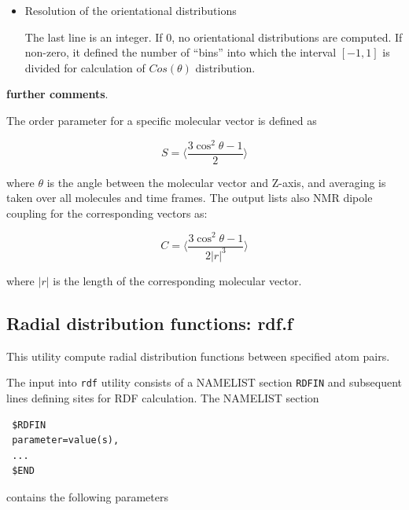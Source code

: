 \documentclass{article}
\begin{document}
\begin{itemize}
\item
Resolution of the orientational distributions

The last line is an integer. If 0, no orientational distributions are 
computed. If non-zero, it defined the number of ``bins'' into which
the interval $[-1,1]$ is divided for calculation of $Cos(\theta)$
distribution.
 
\end{itemize}

{\bf further comments}.

The order parameter for a specific molecular vector is defined as

$$S = \langle \frac{3\cos^2\theta - 1}{2}\rangle$$

where $\theta$ is the angle between the molecular vector and Z-axis, and 
averaging is taken over all molecules and time frames.
The output lists also NMR dipole coupling for the corresponding vectors as:

$$C = \langle \frac{3\cos^2\theta - 1}{2|r|^3}\rangle$$
  
where $|r|$ is the length of the corresponding molecular vector.

\subsection{Radial distribution functions: rdf.f}

This utility compute radial distribution functions between specified 
atom pairs.

The input into \verb|rdf| utility consists of a NAMELIST section
\verb|RDFIN| and subsequent lines defining sites for RDF calculation.
The NAMELIST section

\begin{verbatim}
 $RDFIN
 parameter=value(s),
 ...
 $END
\end{verbatim}

contains the following parameters
\end{document}
